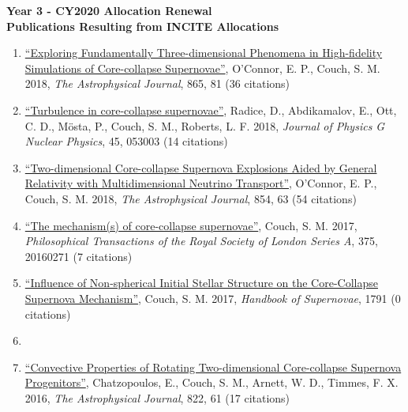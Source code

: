 \documentclass[12pt]{article}
\begin{document}
\begin{center}
{\bf Year 3 - CY2020 Allocation Renewal\\
  Publications Resulting from INCITE Allocations } \vspace{-0.1in}
\end{center}

\begin{enumerate}

  \item \href{https://ui.adsabs.harvard.edu/#abs/2018ApJ...865...81O/abstract}{``Exploring Fundamentally Three-dimensional Phenomena in High-fidelity Simulations of Core-collapse Supernovae''}, O'Connor, E. P., Couch, S. M. 2018, {\itshape The Astrophysical Journal}, 865, 81 (36 citations)

  \item \href{https://ui.adsabs.harvard.edu/#abs/2018JPhG...45e3003R/abstract}{``Turbulence in core-collapse supernovae''}, Radice, D., Abdikamalov, E., Ott, C. D., Mösta, P., Couch, S. M., Roberts, L. F. 2018, {\itshape Journal of Physics G Nuclear Physics}, 45, 053003 (14 citations)

  \item \href{https://ui.adsabs.harvard.edu/#abs/2018ApJ...854...63O/abstract}{``Two-dimensional Core-collapse Supernova Explosions Aided by General Relativity with Multidimensional Neutrino Transport''}, O'Connor, E. P., Couch, S. M. 2018, {\itshape The Astrophysical Journal}, 854, 63 (54 citations)

  \item \href{https://ui.adsabs.harvard.edu/#abs/2017RSPTA.37560271C/abstract}{``The mechanism(s) of core-collapse supernovae''}, Couch, S. M. 2017, {\itshape Philosophical Transactions of the Royal Society of London Series A}, 375, 20160271 (7 citations)

  \item \href{https://ui.adsabs.harvard.edu/#abs/2017hsn..book.1791C/abstract}{``Influence of Non-spherical Initial Stellar Structure on the Core-Collapse Supernova Mechanism''}, Couch, S. M. 2017, {\itshape Handbook of Supernovae}, 1791 (0 citations)
  \item 
  \item \href{https://ui.adsabs.harvard.edu/#abs/2016ApJ...822...61C/abstract}{``Convective Properties of Rotating Two-dimensional Core-collapse Supernova Progenitors''}, Chatzopoulos, E., Couch, S. M., Arnett, W. D., Timmes, F. X. 2016, {\itshape The Astrophysical Journal}, 822, 61 (17 citations)


\end{enumerate}
\end{document}
